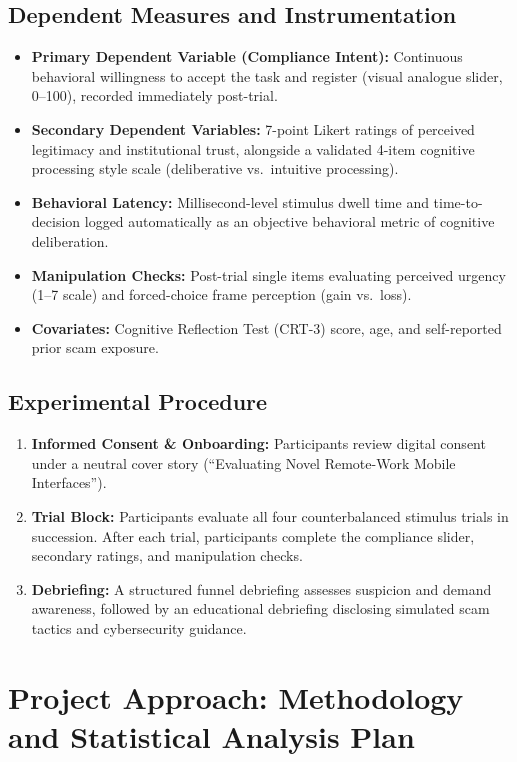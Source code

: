 \documentclass[11pt]{article}
\begin{document}
\subsection{Dependent Measures and Instrumentation}
\begin{itemize}[leftmargin=*]
    \item \textbf{Primary Dependent Variable (Compliance Intent):} Continuous behavioral willingness to accept the task and register (visual analogue slider, 0--100), recorded immediately post-trial.
    \item \textbf{Secondary Dependent Variables:} 7-point Likert ratings of perceived legitimacy and institutional trust, alongside a validated 4-item cognitive processing style scale (deliberative vs.\ intuitive processing).
    \item \textbf{Behavioral Latency:} Millisecond-level stimulus dwell time and time-to-decision logged automatically as an objective behavioral metric of cognitive deliberation.
    \item \textbf{Manipulation Checks:} Post-trial single items evaluating perceived urgency (1--7 scale) and forced-choice frame perception (gain vs.\ loss).
    \item \textbf{Covariates:} Cognitive Reflection Test (CRT-3) score, age, and self-reported prior scam exposure.
\end{itemize}

\subsection{Experimental Procedure}
\begin{enumerate}[leftmargin=*, label=\arabic*.]
    \item \textbf{Informed Consent \& Onboarding:} Participants review digital consent under a neutral cover story (``Evaluating Novel Remote-Work Mobile Interfaces'').
    \item \textbf{Trial Block:} Participants evaluate all four counterbalanced stimulus trials in succession. After each trial, participants complete the compliance slider, secondary ratings, and manipulation checks.
    \item \textbf{Debriefing:} A structured funnel debriefing assesses suspicion and demand awareness, followed by an educational debriefing disclosing simulated scam tactics and cybersecurity guidance.
\end{enumerate}

\section{Project Approach: Methodology and Statistical Analysis Plan}
\end{document}
